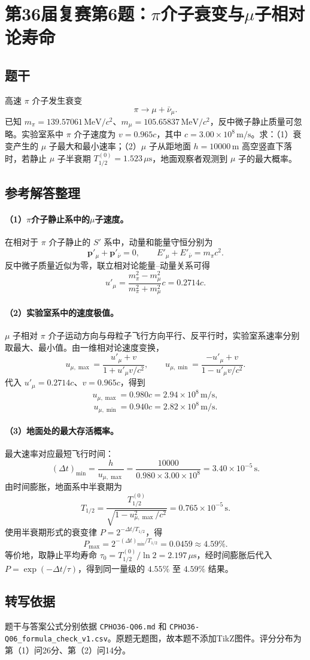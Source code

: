 \section{第36届复赛第6题：$\pi$介子衰变与$\mu$子相对论寿命}
\subsection{题干}
高速 $\pi$ 介子发生衰变
\[
\pi\rightarrow\mu+\bar\nu_\mu.
\]
已知 $m_\pi=139.57061\,\mathrm{MeV}/c^2$、$m_\mu=105.65837\,\mathrm{MeV}/c^2$，反中微子静止质量可忽略。实验室系中 $\pi$ 介子速度为 $v=0.965c$，其中 $c=3.00\times10^8\,\mathrm{m/s}$。求：（1）衰变产生的 $\mu$ 子最大和最小速率；（2）$\mu$ 子从距地面 $h=10000\,\mathrm{m}$ 高空竖直下落时，若静止 $\mu$ 子半衰期 $T_{1/2}^{(0)}=1.523\,\mu\mathrm{s}$，地面观察者观测到 $\mu$ 子的最大概率。

\subsection{参考解答整理}
\paragraph{（1）$\pi$介子静止系中的$\mu$子速度。} 在相对于 $\pi$ 介子静止的 $S'$ 系中，动量和能量守恒分别为
\[
\boldsymbol p'_\mu+\boldsymbol p'_{\bar\nu}=0,
\qquad
E'_\mu+E'_{\bar\nu}=m_\pi c^2.
\]
反中微子质量近似为零，联立相对论能量--动量关系可得
\[
\boxed{u'_\mu=\frac{m_\pi^2-m_\mu^2}{m_\pi^2+m_\mu^2}c=0.2714c.}
\]

\paragraph{（2）实验室系中的速度极值。} $\mu$ 子相对 $\pi$ 介子运动方向与母粒子飞行方向平行、反平行时，实验室系速率分别取最大、最小值。由一维相对论速度变换，
\[
u_{\mu,\max}=\frac{u'_\mu+v}{1+u'_\mu v/c^2},
\qquad
u_{\mu,\min}=\frac{-u'_\mu+v}{1-u'_\mu v/c^2}.
\]
代入 $u'_\mu=0.2714c$、$v=0.965c$，得到
\[
\boxed{u_{\mu,\max}=0.980c=2.94\times10^8\,\mathrm{m/s},}
\]
\[
\boxed{u_{\mu,\min}=0.940c=2.82\times10^8\,\mathrm{m/s}.}
\]

\paragraph{（3）地面处的最大存活概率。} 最大速率对应最短飞行时间：
\[
(\Delta t)_{\min}=\frac{h}{u_{\mu,\max}}
=\frac{10000}{0.980\times3.00\times10^8}
=3.40\times10^{-5}\,\mathrm{s}.
\]
由时间膨胀，地面系中半衰期为
\[
T_{1/2}=\frac{T_{1/2}^{(0)}}{\sqrt{1-u_{\mu,\max}^2/c^2}}
=0.765\times10^{-5}\,\mathrm{s}.
\]
使用半衰期形式的衰变律 $P=2^{-\Delta t/T_{1/2}}$，得
\[
\boxed{P_{\max}=2^{-(\Delta t)_{\min}/T_{1/2}}=0.0459\approx4.59\%.}
\]
等价地，取静止平均寿命 $\tau_0=T_{1/2}^{(0)}/\ln2=2.197\,\mu\mathrm{s}$，经时间膨胀后代入 $P=\exp(-\Delta t/\tau)$，得到同一量级的 $4.55\%$ 至 $4.59\%$ 结果。

\subsection{转写依据}
题干与答案公式分别依据 \texttt{CPHO36-Q06.md} 和 \texttt{CPHO36-Q06\_formula\_check\_v1.csv}。原题无题图，故本题不添加TikZ图件。评分分布为第（1）问26分、第（2）问14分。

